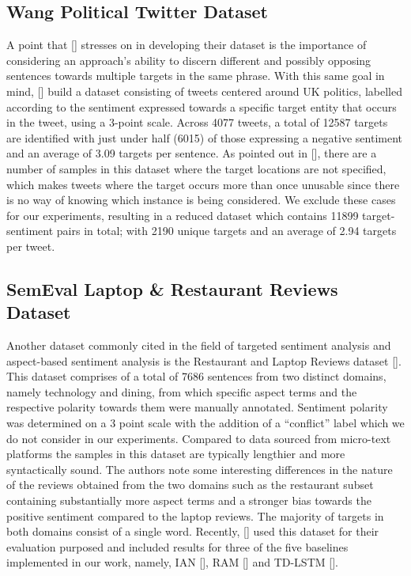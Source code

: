 \documentclass[12pt, a4paper]{report}
\theoremstyle{definition}
\theoremstyle{definition}%
\theoremstyle{definition}%
\theoremstyle{definition}%
\theoremstyle{definition}%
\theoremstyle{definition}%
\renewcommand{\cite}[1]{[\citealp{#1}]}
\begin{document}
\subsection{Wang Political Twitter Dataset}
A point that \cite{saeidi2016} stresses on in developing their dataset is the importance of considering an approach's ability to discern different and possibly opposing sentences towards multiple targets in the same phrase. With this same goal in mind, \cite{wang2017} build a dataset consisting of tweets centered around UK politics, labelled according to the sentiment expressed towards a specific target entity that occurs in the tweet, using a 3-point scale. Across 4077 tweets, a total of 12587 targets are identified with just under half (6015) of those expressing a negative sentiment and an average of 3.09 targets per sentence. As pointed out in \cite{moore2018}, there are a number of samples in this dataset where the target locations are not specified, which makes tweets where the target occurs more than once unusable since there is no way of knowing which instance is being considered. We exclude these cases for our experiments, resulting in a reduced dataset which contains 11899 target-sentiment pairs in total; with 2190 unique targets and an average of 2.94 targets per tweet. 

\subsection{SemEval Laptop \& Restaurant Reviews Dataset}
Another dataset commonly cited in the field of targeted sentiment analysis and aspect-based sentiment analysis is the Restaurant and Laptop Reviews dataset \cite{pontiki}. This dataset comprises of a total of 7686 sentences from two distinct domains, namely technology and dining, from which specific aspect terms and the respective polarity towards them were manually annotated. Sentiment polarity was determined on a 3 point scale with the addition of a \enquote{conflict} label which we do not consider in our experiments. Compared to data sourced from micro-text platforms the samples in this dataset are typically lengthier and more syntactically sound. The authors note some interesting differences in the nature of the reviews obtained from the two domains such as the restaurant subset containing substantially more aspect terms and a stronger bias towards the positive sentiment compared to the laptop reviews. The majority of targets in both domains consist of a single word. Recently, \cite{xue2018} used this dataset for their evaluation purposed and included results for three of the five baselines implemented in our work, namely, IAN \cite{dehongma2017}, RAM \cite{chen2017} and TD-LSTM \cite{tang2016b}. 
\end{document}

